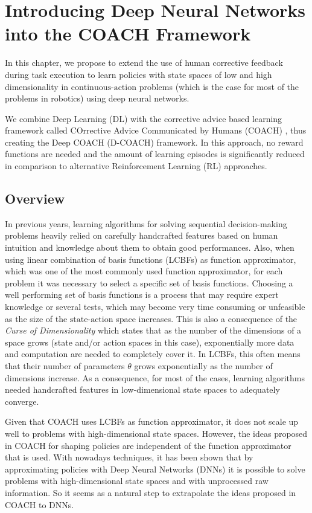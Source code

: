 \chapter{Introducing Deep Neural Networks into the COACH Framework}
In this chapter, we propose to extend the use of human corrective feedback during task execution to learn policies with state spaces of low and high dimensionality in $\text{continuous-action}$ problems (which is the case for most of the problems in robotics) using deep neural networks.

We combine Deep Learning (DL) with the corrective advice based learning framework called COrrective Advice Communicated by Humans (COACH) \cite{Celemin2018AnInteractive}, thus creating the Deep COACH (D-COACH) framework. In this approach, no reward functions are needed and the amount of learning episodes is significantly reduced in comparison to alternative Reinforcement Learning (RL) approaches.

\section{Overview}
In previous years, learning algorithms for solving sequential decision-making problems heavily relied on carefully handcrafted features based on human intuition and knowledge about them to obtain good performances. Also, when using linear combination of basis functions (LCBFs) as function approximator, which was one of the most commonly used function approximator, for each problem it was necessary to select a specific set of basis functions. Choosing a well performing set of basis functions is a process that may require expert knowledge or several tests, which may become very time consuming or unfeasible as the size of the $\text{state-action}$ space increases. This is also a consequence of the \emph{Curse of Dimensionality} \cite{bellman2003dynamic} which states that as the number of the dimensions of a space grows (state and/or action spaces in this case), exponentially more data and computation are needed to completely cover it. In LCBFs, this often means that their number of parameters $\theta$ grows exponentially as the number of dimensions increase. As a consequence, for most of the cases, learning algorithms needed handcrafted features in low-dimensional state spaces to adequately converge.

Given that COACH uses LCBFs as function approximator, it does not scale up well to problems with high-dimensional state spaces. However, the ideas proposed in COACH for shaping policies are independent of the function approximator that is used. With nowadays techniques, it has been shown that by approximating policies with Deep Neural Networks (DNNs) it is possible to solve problems with high-dimensional state spaces and with unprocessed raw information. So it seems as a natural step to extrapolate the ideas proposed in COACH to DNNs. 

